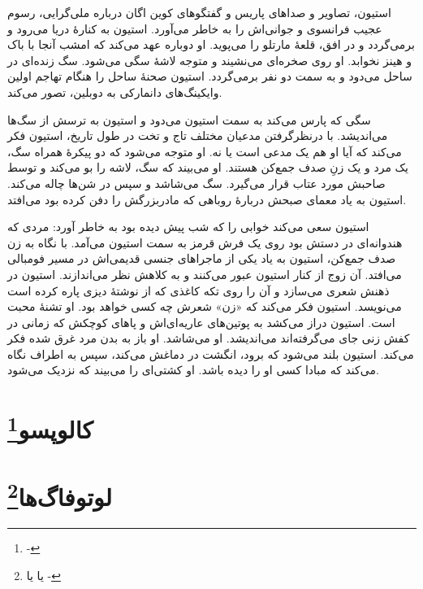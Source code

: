 \documentclass[12pt]{book}
\begin{document}
    استیون، تصاویر و صداهای پاریس و گفتگوهای کوین اگان درباره ملی‌گرایی، رسوم عجیب فرانسوی و جوانی‌اش را به خاطر می‌آورد. استیون به کنارۀ دریا می‌رود و برمی‌گردد و در افق، قلعۀ مارتلو را می‌پوید. او دوباره عهد می‌کند که امشب آنجا با باک و هینز نخوابد. او روی صخره‌ای می‌نشیند و متوجه لاشۀ سگی می‌شود. سگ زنده‌ای در ساحل می‌دود و به سمت دو نفر برمی‌گردد. استیون صحنۀ ساحل را هنگام تهاجم اولین وایکینگ‌های دانمارکی به دوبلین، تصور می‌کند.

    سگی که پارس می‌کند به سمت استیون می‌دود و استیون به ترسش از سگ‌ها می‌اندیشد. با درنظرگرفتن مدعیان مختلف تاج و تخت در طول تاریخ، استیون فکر می‌کند که آیا او هم یک مدعی است یا نه. او متوجه می‌شود که دو پیکرۀ همراه سگ، یک مرد و یک زنِ صدف جمع‌کن هستند. او می‌بیند که سگ، لاشه را بو می‌کند و توسط صاحبش مورد عتاب قرار می‌گیرد. سگ می‌شاشد و سپس در شن‌ها چاله می‌کند. استیون به یاد معمای صبحش دربارۀ روباهی که مادربزرگش را دفن کرده بود می‌افتد.

    استیون سعی می‌کند خوابی را که شب پیش دیده بود به خاطر آورد: مردی که هندوانه‌ای در دستش بود روی یک فرش قرمز به سمت استیون می‌آمد. با نگاه به زن صدف جمع‌کن، استیون به یاد یکی از ماجراهای جنسی قدیمی‌اش در مسیر فومبالی می‌افتد. آن زوج از کنار استیون عبور می‌کنند و به کلاهش نظر می‌اندازند. استیون در ذهنش شعری می‌سازد و آن را روی تکه‌ کاغذی که از نوشتۀ دیزی پاره کرده است می‌نویسد. استیون فکر می‌کند که «زن» شعرش چه کسی خواهد بود. او تشنۀ محبت است. استیون دراز می‌کشد به پوتین‌های عاریه‌ای‌اش و پاهای کوچکش که زمانی در کفش زنی جای می‌گرفته‌اند می‌اندیشد. او می‌شاشد. او باز به بدن مرد غرق شده فکر می‌کند. استیون بلند می‌شود که برود، انگشت در دماغش می‌کند، سپس به اطراف نگاه می‌کند که مبادا کسی او را دیده باشد. او کشتی‌ای را می‌بیند که نزدیک می‌شود.

    \chapter[کالوپسو]{کالوپسو\protect\footnote{-}}\label{ep:4}

    \chapter[لوتوفاگ‌ها]{لوتوفاگ‌ها\protect\footnote{ یا  یا -}}\label{ep:5}
\end{document}
